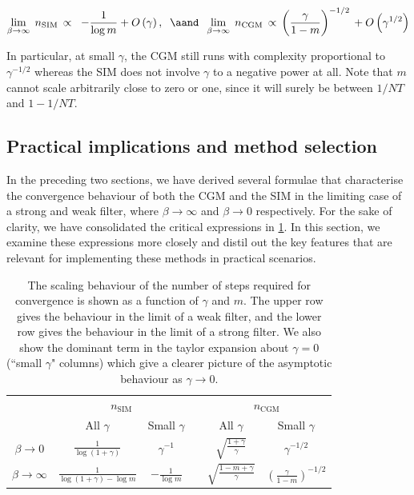 \begin{equation*}
    \lim_{\beta \rightarrow \infty} \;  n_\text{SIM} \, \propto \;\;  -\frac{1}{\log m} + O\left(\gamma\right), \;\; \aand \;\; \lim_{\beta \rightarrow \infty} \;  n_\text{CGM} \, \propto \, \left(\frac{\gamma}{1 - m} \right)^{-1/2} \, + O\left(\gamma^{1/2}\right) 
\end{equation*}


In particular, at small $\gamma$, the CGM still runs with complexity proportional to $\gamma^{-1/2}$ whereas the SIM does not involve $\gamma$ to a negative power at all. Note that $m$ cannot scale arbitrarily close to zero or one, since it will surely be between $1/NT$ and $1 - 1/NT$. 


\subsection{Practical implications and method selection}

In the preceding two sections, we have derived several formulae that characterise the convergence behaviour of both the CGM and the SIM in the limiting case of a strong and weak filter, where $\beta \rightarrow \infty$ and $\beta \rightarrow 0$ respectively. For the sake of clarity, we have consolidated the critical expressions in \cref{tab:conv_SIM_CGM}. In this section, we examine these expressions more closely and distil out the key features that are relevant for implementing these methods in practical scenarios.


\begin{table}[t]
    \centering
    \def\arraystretch{1.5}
    \begin{tabular}{@{}cccccc}
    \toprule
    & \multicolumn{2}{c}{$n_\text{SIM}$} & \phantom{abc}& \multicolumn{2}{c}{$n_\text{CGM}$} \\
    \cmidrule{2-3} \cmidrule{5-6}
                               & All $\gamma$   & Small $\gamma$   &&  All $\gamma$   & Small $\gamma$ \\ \midrule \rule{0pt}{1cm}
    $\beta \rightarrow 0$      & $ \displaystyle \frac{1}{\log(1 + \gamma)}$   & $\displaystyle \gamma^{-1}$    &&    $\displaystyle \sqrt{\frac{1 + \gamma}{\gamma}}$ & $\displaystyle \gamma^{-1/2}$    \\ \rule{0pt}{6ex}
    $\beta \rightarrow \infty$ & $\displaystyle \frac{1}{\log(1 + \gamma) - \log m}$ & $\displaystyle -\frac{1}{\log m}$    &&  $\displaystyle \sqrt{\frac{1 - m + \gamma}{\gamma}}$ & $\displaystyle \left(\frac{\gamma}{1 - m} \right)^{-1/2}$ \\[0.5cm] \bottomrule 
    \end{tabular}
    \caption{The scaling behaviour of the number of steps required for convergence is shown as a function of $\gamma$ and $m$. The upper row gives the behaviour in the limit of a weak filter, and the lower row gives the behaviour in the limit of a strong filter. We also show the dominant term in the taylor expansion about $\gamma=0$ (``small $\gamma$" columns) which give a clearer picture of the asymptotic behaviour as $\gamma \rightarrow 0$. }
    \label{tab:conv_SIM_CGM} 
\end{table}

